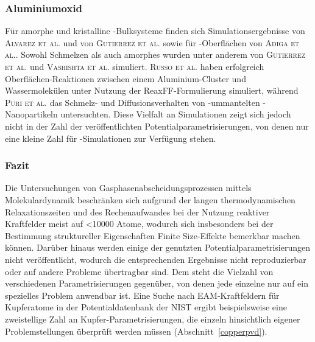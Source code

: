 \subsubsection{Aluminiumoxid}
Für amorphe und kristalline -Bulksysteme finden sich Simulationsergebnisse von \textsc{Alvarez et al.}\cite{alvarez_computer_1995,alvarez_molecular_1992} und von \textsc{Gutierrez et al.}\cite{gutierrez_molecular_2002} sowie für -Oberflächen von \textsc{Adiga et al.}\cite{adiga_atomistic_2006}.
Sowohl Schmelzen als auch amorphes  wurden unter anderem von \textsc{Gutierrez et al.}\cite{gutierrez_structural_2000} und \textsc{Vashishta et al.}\cite{vashishta_interaction_2008} simuliert.
\textsc{Russo et al.}\cite{russo_molecular_2011} haben erfolgreich Oberflächen-Reaktionen zwischen einem Aluminium-Cluster und Wassermolekülen unter Nutzung der ReaxFF-Formulierung simuliert, während \textsc{Puri et al.}\cite{puri_thermo-mechanical_2010} das Schmelz- und Diffusionsverhalten von -ummantelten -Nanopartikeln untersuchten.
Diese Vielfalt an Simulationen zeigt sich jedoch nicht in der Zahl der veröffentlichten Potentialparametrisierungen, von denen nur eine kleine Zahl für -Simulationen zur Verfügung stehen.

\subsubsection{Fazit}
Die Untersuchungen von Gasphasenabscheidungsprozessen mittels Molekulardynamik beschränken sich aufgrund der langen thermodynamischen Relaxationszeiten und des Rechenaufwandes bei der Nutzung reaktiver Kraftfelder meist auf \num{<10000} Atome, wodurch sich insbesonders bei der Bestimmung struktureller Eigenschaften Finite Size-Effekte bemerkbar machen können.
Darüber hinaus werden einige der genutzten Potentialparametrisierungen nicht veröffentlicht, wodurch die entsprechenden Ergebnisse nicht reproduzierbar oder auf andere Probleme übertragbar sind.
Dem steht die Vielzahl von verschiedenen Parametrisierungen gegenüber, von denen jede einzelne nur auf ein spezielles Problem anwendbar ist.
Eine Suche nach EAM-Kraftfeldern für Kupferatome in der Potentialdatenbank der NIST\cite{becker_interatomic_2014} ergibt beispielsweise eine zweistellige Zahl an Kupfer-Parametrisierungen, die einzeln hinsichtlich eigener Problemstellungen überprüft werden müssen (Abschnitt~\ref{copperpvd}).
